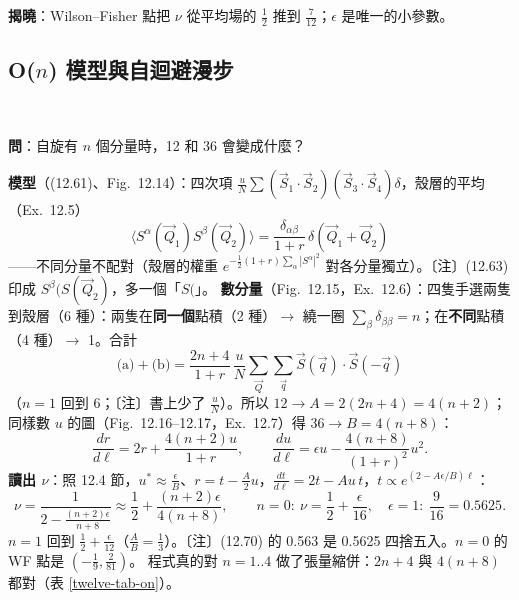 \textbf{揭曉}：Wilson--Fisher 點把 $\nu$ 從平均場的 $\frac12$ 推到 $\frac7{12}$；$\epsilon$ 是唯一的小參數。

\subsection{O(\texorpdfstring{$n$}{n}) 模型與自迴避漫步}
\leavevmode{}\ \par\nopagebreak

\textbf{問}：自旋有 $n$ 個分量時，12 和 36 會變成什麼？

\textbf{模型}（(12.61)、Fig.~12.14）：四次項 $\frac uN\sum(\vec S_1\cdot\vec S_2)(\vec S_3\cdot\vec S_4)\delta$，殼層的平均（Ex.~12.5）
\[\big\langle S^\alpha(\vec Q_1)S^\beta(\vec Q_2)\big\rangle=\frac{\delta_{\alpha\beta}}{1+r}\,\delta(\vec Q_1+\vec Q_2)\tag{12.63}\]
——不同分量不配對（殼層的權重 $e^{-\frac12(1+r)\sum_\alpha|S^\alpha|^2}$ 對各分量獨立）。〔注〕(12.63) 印成 $S^\beta(S(\vec Q_2)$，多一個「$S($」。
\textbf{數分量}（Fig.~12.15，Ex.~12.6）：四隻手選兩隻到殼層（6 種）：兩隻在\textbf{同一個}點積（2 種）$\to$ 繞一圈 $\sum_\beta\delta_{\beta\beta}=n$；在\textbf{不同}點積（4 種）$\to$ 1。合計
\[\text{(a)}+\text{(b)}=\frac{2n+4}{1+r}\,\frac uN\sum_{\vec Q}\sum_{\vec q}\vec S(\vec q)\cdot\vec S(-\vec q)\tag{12.64}\]
（$n=1$ 回到 6；〔注〕書上少了 $\frac uN$）。所以 $12\to A=2(2n+4)=4(n+2)$；同樣數 $u$ 的圖（Fig.~12.16--12.17，Ex.~12.7）得 $36\to B=4(n+8)$：
\[\frac{dr}{d\ell}=2r+\frac{4(n+2)u}{1+r},\qquad\frac{du}{d\ell}=\epsilon u-\frac{4(n+8)}{(1+r)^2}u^2 .\tag{12.66--12.67}\]
\textbf{讀出 $\nu$}：照 12.4 節，$u^*\approx\frac\epsilon B$、$r=t-\frac A2u$，$\frac{dt}{d\ell}=2t-Au\,t$，$t\propto e^{(2-A\epsilon/B)\ell}$：
\[\nu=\frac1{2-\frac{(n+2)\epsilon}{n+8}}\approx\frac12+\frac{(n+2)\epsilon}{4(n+8)},\qquad n=0:\ \nu=\frac12+\frac\epsilon{16},\quad\epsilon=1:\ \frac9{16}=0.5625 .\tag{12.68--12.70}\]
$n=1$ 回到 $\frac12+\frac\epsilon{12}$（$\frac AB=\frac13$）。〔注〕(12.70) 的 0.563 是 0.5625 四捨五入。$n=0$ 的 WF 點是 $(-\frac19,\frac2{81})$。
程式真的對 $n=1..4$ 做了張量縮併：$2n+4$ 與 $4(n+8)$ 都對（表 \ref{twelve-tab-on}）。

\begin{table}[htbp]
\centering\footnotesize\setlength{\tabcolsep}{4pt}
\TwelveTabOn
\caption{O($n$) 模型（$\epsilon=1$）：殼層的因子與 $\nu$ 的三種讀法；已知值只引用。$n=0$ 是自迴避漫步、$n=1$ Ising、$n=2$ XY、$n=3$ Heisenberg}\label{twelve-tab-on}
\end{table}


